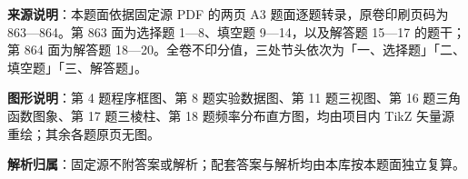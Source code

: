 

\begin{gknotice}
\textbf{来源说明}：本题面依据固定源 PDF 的两页 A3 题面逐题转录，原卷印刷页码为 863—864。第 863 面为选择题 1—8、填空题 9—14，以及解答题 15—17 的题干；第 864 面为解答题 18—20。全卷不印分值，三处节头依次为「一、选择题」「二、填空题」「三、解答题」。

\textbf{图形说明}：第 4 题程序框图、第 8 题实验数据图、第 11 题三视图、第 16 题三角函数图象、第 17 题三棱柱、第 18 题频率分布直方图，均由项目内 TikZ 矢量源重绘；其余各题原页无图。

\textbf{解析归属}：固定源不附答案或解析；配套答案与解析均由本库按本题面独立复算。
\end{gknotice}


